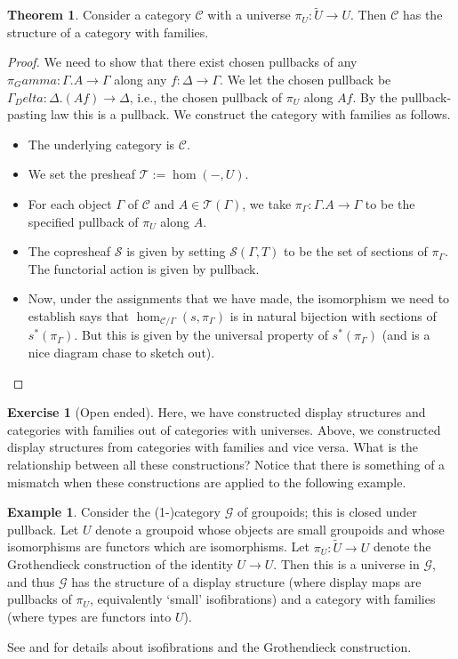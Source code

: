\documentclass{article}
\theoremstyle{definition}
\newtheorem{theorem}[definition]{Theorem}
\newtheorem{exercise}[definition]{Exercise}
\newtheorem{example}[definition]{Example}
\newcommand{\types}{\mathcal T}
\newcommand{\terms}{\mathcal S}
\newcommand{\C}{\mathcal C}
\newcommand{\grpd}{\mathcal G}
\begin{document}
\begin{theorem}
    Consider a category $\C$ with a universe $\pi_U : \tilde{U} \to U$. Then $\C$ has the structure of a category with families.
\end{theorem}
\begin{proof}
    We need to show that there exist chosen pullbacks of any $\pi_Gamma : \Gamma. A \to \Gamma$ along any $f: \Delta \to \Gamma$. We let the chosen pullback be $\Gamma_Delta : \Delta. (A f) \to \Delta$, i.e., the chosen pullback of $\pi_U$ along $A f$. By the pullback-pasting law this is a pullback.
    We construct the category with families as follows.
    \begin{itemize}
        \item The underlying category is $\C$.
        \item We set the presheaf $\types := \hom(- , U)$.
        \item For each object $\Gamma$ of $\C$ and $A \in \types (\Gamma)$, we take $\pi_\Gamma : \Gamma.A \to \Gamma$ to be the specified pullback of $\pi_U$ along $A$.
        \item The copresheaf $\terms$ is given by setting $\terms (\Gamma , T)$ to be the set of sections of $\pi_\Gamma$. The functorial action is given by pullback.
        \item Now, under the assignments that we have made, the isomorphism we need to establish says that $\hom_{\C / \Gamma}(s, \pi_\Gamma)$ is in natural bijection with sections of $s^* (\pi_\Gamma)$. But this is given by the universal property of $s^* (\pi_\Gamma)$ (and is a nice diagram chase to sketch out). \qedhere
    \end{itemize}
\end{proof}

\begin{exercise}[Open ended]
    Here, we have constructed display structures and categories with families out of categories with universes. Above, we constructed display structures from categories with families and vice versa. What is the relationship between all these constructions? Notice that there is something of a mismatch when these constructions are applied to the following example.
\end{exercise}

\begin{example}
    Consider the (1-)category $\grpd$ of groupoids; this is closed under pullback. Let $U$ denote a groupoid whose objects are small groupoids and whose isomorphisms are functors which are isomorphisms. Let $\pi_U: \tilde U \to U$ denote the Grothendieck construction of the identity $U \to U$. Then this is a universe in $\grpd$, and thus $\grpd$ has the structure of a display structure (where display maps are pullbacks of $\pi_U$, equivalently `small' isofibrations) and a category with families (where types are functors into $U$).

    See \cite{nLab-iso} and \cite{nLab-grothcons} for details about isofibrations and the Grothendieck construction.
\end{example}
\end{document}
